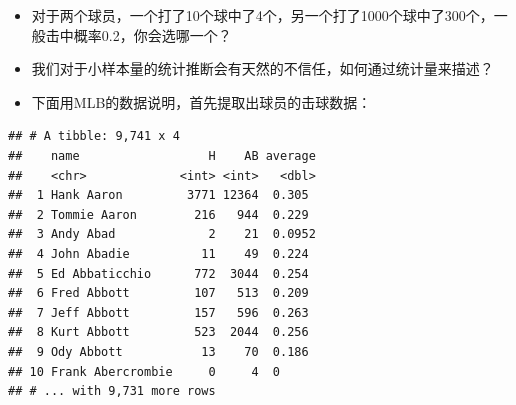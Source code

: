 \documentclass[
]{book}
\newenvironment{Shaded}{\begin{snugshade}}{\end{snugshade}}
\newcommand{\CommentTok}[1]{\textcolor[rgb]{0.56,0.35,0.01}{\textit{#1}}}
\newcommand{\DataTypeTok}[1]{\textcolor[rgb]{0.13,0.29,0.53}{#1}}
\newcommand{\DecValTok}[1]{\textcolor[rgb]{0.00,0.00,0.81}{#1}}
\newcommand{\KeywordTok}[1]{\textcolor[rgb]{0.13,0.29,0.53}{\textbf{#1}}}
\newcommand{\NormalTok}[1]{#1}
\newcommand{\OperatorTok}[1]{\textcolor[rgb]{0.81,0.36,0.00}{\textbf{#1}}}
\newcommand{\StringTok}[1]{\textcolor[rgb]{0.31,0.60,0.02}{#1}}
\begin{document}
\begin{itemize}
\item
  对于两个球员，一个打了10个球中了4个，另一个打了1000个球中了300个，一般击中概率0.2，你会选哪一个？
\item
  我们对于小样本量的统计推断会有天然的不信任，如何通过统计量来描述？
\item
  下面用MLB的数据说明，首先提取出球员的击球数据：
\end{itemize}

\begin{Shaded}
\end{Shaded}

\begin{verbatim}
## # A tibble: 9,741 x 4
##    name                  H    AB average
##    <chr>             <int> <int>   <dbl>
##  1 Hank Aaron         3771 12364  0.305 
##  2 Tommie Aaron        216   944  0.229 
##  3 Andy Abad             2    21  0.0952
##  4 John Abadie          11    49  0.224 
##  5 Ed Abbaticchio      772  3044  0.254 
##  6 Fred Abbott         107   513  0.209 
##  7 Jeff Abbott         157   596  0.263 
##  8 Kurt Abbott         523  2044  0.256 
##  9 Ody Abbott           13    70  0.186 
## 10 Frank Abercrombie     0     4  0     
## # ... with 9,731 more rows
\end{verbatim}
\end{document}
